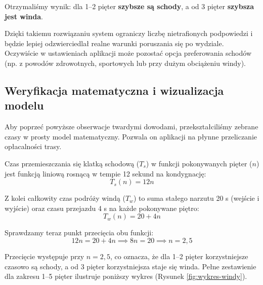 \documentclass[14pt,a4paper]{extarticle}
\begin{document}
Otrzymaliśmy wynik: dla 1--2 pięter \textbf{szybsze są schody}, a od 3 pięter \textbf{szybsza jest winda}.

Dzięki takiemu rozwiązaniu system ograniczy liczbę nietrafionych podpowiedzi i będzie lepiej odzwierciedlał realne warunki poruszania się po wydziale. Oczywiście w ustawieniach aplikacji może pozostać opcja preferowania schodów (np. z powodów zdrowotnych, sportowych lub przy dużym obciążeniu windy).

\subsection{Weryfikacja matematyczna i wizualizacja modelu}

Aby poprzeć powyższe obserwacje twardymi dowodami, przekształciliśmy zebrane czasy w prosty model matematyczny. Pozwala on aplikacji na płynne przeliczanie opłacalności trasy.

Czas przemieszczania się klatką schodową ($T_s$) w funkcji pokonywanych pięter ($n$) jest funkcją liniową rosnącą w tempie 12 sekund na kondygnację:
\begin{equation}
    T_s(n) = 12n
\end{equation}

Z kolei całkowity czas podróży windą ($T_w$) to suma stałego narzutu 20 s (wejście i wyjście) oraz czasu przejazdu 4 s na każde pokonywane piętro:
\begin{equation}
    T_w(n) = 20 + 4n
\end{equation}

Sprawdzamy teraz punkt przecięcia obu funkcji:
\begin{equation}
    12n = 20 + 4n \implies 8n = 20 \implies n = 2{,}5
\end{equation}

Przecięcie występuje przy $n=2{,}5$, co oznacza, że dla 1--2 pięter korzystniejsze czasowo są schody, a od 3 pięter korzystniejsza staje się winda. Pełne zestawienie dla zakresu 1--5 pięter ilustruje poniższy wykres (Rysunek \ref{fig:wykres-windy}).
\end{document}
